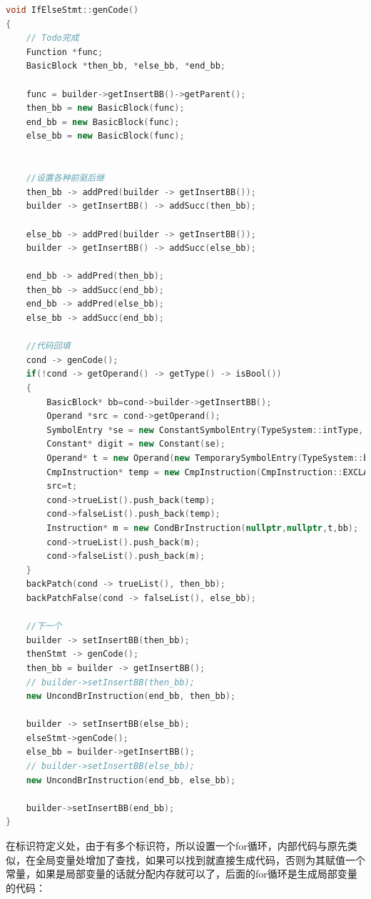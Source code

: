 \documentclass[UTF8,a4paper,10pt]{ctexart}
\begin{document}
\begin{lstlisting}[title = ifelse代码展示, language = c++]
void IfElseStmt::genCode()
{
    // Todo完成
    Function *func;
    BasicBlock *then_bb, *else_bb, *end_bb;

    func = builder->getInsertBB()->getParent();
    then_bb = new BasicBlock(func);
    end_bb = new BasicBlock(func);
    else_bb = new BasicBlock(func);


    //设置各种前驱后继
    then_bb -> addPred(builder -> getInsertBB());
    builder -> getInsertBB() -> addSucc(then_bb);

    else_bb -> addPred(builder -> getInsertBB());
    builder -> getInsertBB() -> addSucc(else_bb);

    end_bb -> addPred(then_bb);
    then_bb -> addSucc(end_bb);
    end_bb -> addPred(else_bb);
    else_bb -> addSucc(end_bb);

    //代码回填
    cond -> genCode();
    if(!cond -> getOperand() -> getType() -> isBool())
    {
        BasicBlock* bb=cond->builder->getInsertBB();
        Operand *src = cond->getOperand();
        SymbolEntry *se = new ConstantSymbolEntry(TypeSystem::intType, 0);
        Constant* digit = new Constant(se);
        Operand* t = new Operand(new TemporarySymbolEntry(TypeSystem::boolType, SymbolTable::getLabel()));
        CmpInstruction* temp = new CmpInstruction(CmpInstruction::EXCLAMATION, t, src, digit->getOperand(), bb);
        src=t;
        cond->trueList().push_back(temp);
        cond->falseList().push_back(temp);
        Instruction* m = new CondBrInstruction(nullptr,nullptr,t,bb);
        cond->trueList().push_back(m);
        cond->falseList().push_back(m);
    }
    backPatch(cond -> trueList(), then_bb);
    backPatchFalse(cond -> falseList(), else_bb);

    //下一个
    builder -> setInsertBB(then_bb);
    thenStmt -> genCode();
    then_bb = builder -> getInsertBB();
    // builder->setInsertBB(then_bb);
    new UncondBrInstruction(end_bb, then_bb);

    builder -> setInsertBB(else_bb);
    elseStmt->genCode();
    else_bb = builder->getInsertBB();
    // builder->setInsertBB(else_bb);
    new UncondBrInstruction(end_bb, else_bb);

    builder->setInsertBB(end_bb);
}
\end{lstlisting}
在标识符定义处，由于有多个标识符，所以设置一个for循环，内部代码与原先类似，在全局变量处增加了查找，如果可以找到就直接生成代码，否则为其赋值一个常量，如果是局部变量的话就分配内存就可以了，后面的for循环是生成局部变量的代码：
\end{document}

